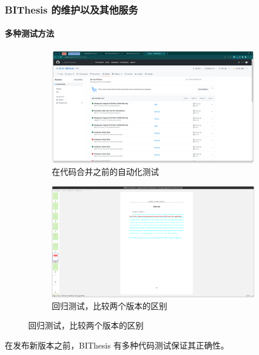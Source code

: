 \documentclass[
  aspectratio=169,
  presentation,
  titlegraphic=./images/bit.png,
  framelogo=./images/bit.png
]{bitbeamer}
\begin{document}
\begin{frame}[c]
  \frametitle{BIThesis 的维护以及其他服务}
  \framesubtitle{多种测试方法}

\begin{figure}
    \centering
    \begin{subfigure}{0.49\textwidth}
      \includegraphics[width=\textwidth]{images/2.png}
      \caption{在代码合并之前的自动化测试}\label{fig:1-1}
  \end{subfigure}
  \begin{subfigure}{0.49\textwidth}
      \includegraphics[width=\textwidth]{images/3.png}
      \caption{回归测试，比较两个版本的区别}\label{fig:1-2}
  \end{subfigure}
  \end{figure}
  
在发布新版本之前，BIThesis 有多种代码测试保证其正确性。
\end{frame}
\end{document}
